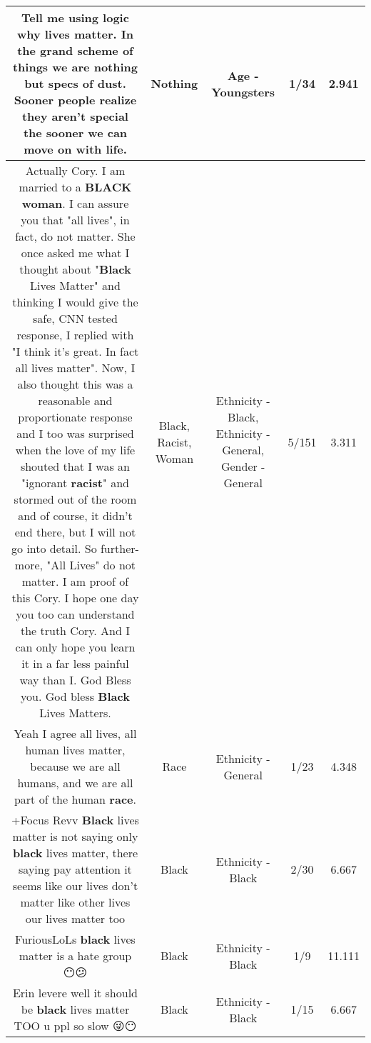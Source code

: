 \documentclass[11pt]{article}
\newlength\mylength
\begin{document}
\begin{center}
\begin{longtable}{|C{.65\mylength}|C{.30\mylength}|C{.12\mylength}|C{.12\mylength}|C{.12\mylength}|}
  \small Tell me using logic why lives matter. In the grand scheme of things we are \textbf{nothing} but specs of dust. Sooner people realize they aren't special the sooner we can move on with life.\normalsize   & Nothing & Age - Youngsters & 1/34 & 2.941 \\  \hline
  \small Actually Cory.  I am married to a \textbf{BLACK} \textbf{woman}.  I can assure you that "all lives", in fact, do not matter.  She once asked me what I thought about "\textbf{Black} Lives Matter" and thinking I would give the safe, CNN tested response, I replied with "I think it's great.  In fact all lives matter".   Now, I also thought this was a reasonable and proportionate response and I too was surprised when the love of my life shouted that I was an "ignorant \textbf{racist}" and stormed out of the room and of course, it didn't end there, but I will not go into detail. So further-more, "All Lives" do not matter.  I am proof of this Cory.   I hope one day you too can understand the truth Cory.  And I can only hope you learn it in a far less painful way than I.  God Bless you.  God bless \textbf{Black} Lives Matters.\normalsize   & Black, Racist, Woman & Ethnicity - Black, Ethnicity - General, Gender - General & 5/151 & 3.311 \\  \hline
  \small Yeah I agree all lives, all human lives matter, because we are all humans, and we are all part of the human \textbf{race}.\normalsize   & Race & Ethnicity - General & 1/23 & 4.348 \\  \hline
  \small +Focus Revv \textbf{Black} lives matter is not saying only \textbf{black} lives matter, there saying pay attention it seems like our lives don't matter like other lives our lives matter too\normalsize   & Black & Ethnicity - Black & 2/30 & 6.667 \\  \hline
  \small FuriousLoLs \textbf{black} lives matter is a hate group 😶😕\normalsize   & Black & Ethnicity - Black & 1/9 & 11.111 \\  \hline
  \small Erin levere well it should be \textbf{black} lives matter TOO u ppl so slow 😜😶\normalsize   & Black & Ethnicity - Black & 1/15 & 6.667 \\  \hline

\end{longtable}
\end{center}
\end{document}
